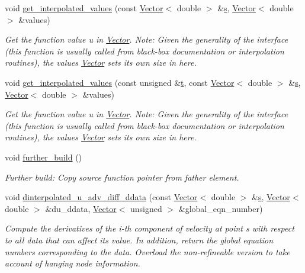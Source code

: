 \begin{DoxyCompactItemize}
void \hyperlink{classoomph_1_1RefineableAdvectionDiffusionEquations_af9dd36503e3196a7f640dbcebb22551d}{get\+\_\+interpolated\+\_\+values} (const \hyperlink{classoomph_1_1Vector}{Vector}$<$ double $>$ \&\hyperlink{cfortran_8h_ab7123126e4885ef647dd9c6e3807a21c}{s}, \hyperlink{classoomph_1_1Vector}{Vector}$<$ double $>$ \&values)
\begin{DoxyCompactList}\small\item\em Get the function value u in \hyperlink{classoomph_1_1Vector}{Vector}. Note\+: Given the generality of the interface (this function is usually called from black-\/box documentation or interpolation routines), the values \hyperlink{classoomph_1_1Vector}{Vector} sets its own size in here. \end{DoxyCompactList}\item 
void \hyperlink{classoomph_1_1RefineableAdvectionDiffusionEquations_a0a916bc1f20ff94e7feed984d41148fb}{get\+\_\+interpolated\+\_\+values} (const unsigned \&\hyperlink{cfortran_8h_af6f0bd3dc13317f895c91323c25c2b8f}{t}, const \hyperlink{classoomph_1_1Vector}{Vector}$<$ double $>$ \&\hyperlink{cfortran_8h_ab7123126e4885ef647dd9c6e3807a21c}{s}, \hyperlink{classoomph_1_1Vector}{Vector}$<$ double $>$ \&values)
\begin{DoxyCompactList}\small\item\em Get the function value u in \hyperlink{classoomph_1_1Vector}{Vector}. Note\+: Given the generality of the interface (this function is usually called from black-\/box documentation or interpolation routines), the values \hyperlink{classoomph_1_1Vector}{Vector} sets its own size in here. \end{DoxyCompactList}\item 
void \hyperlink{classoomph_1_1RefineableAdvectionDiffusionEquations_a093f39b8be3671828b7018b1f6103c68}{further\+\_\+build} ()
\begin{DoxyCompactList}\small\item\em Further build\+: Copy source function pointer from father element. \end{DoxyCompactList}\item 
void \hyperlink{classoomph_1_1RefineableAdvectionDiffusionEquations_abebbab739a9f15f659ad6039499c7e59}{dinterpolated\+\_\+u\+\_\+adv\+\_\+diff\+\_\+ddata} (const \hyperlink{classoomph_1_1Vector}{Vector}$<$ double $>$ \&\hyperlink{cfortran_8h_ab7123126e4885ef647dd9c6e3807a21c}{s}, \hyperlink{classoomph_1_1Vector}{Vector}$<$ double $>$ \&du\+\_\+ddata, \hyperlink{classoomph_1_1Vector}{Vector}$<$ unsigned $>$ \&global\+\_\+eqn\+\_\+number)
\begin{DoxyCompactList}\small\item\em Compute the derivatives of the i-\/th component of velocity at point s with respect to all data that can affect its value. In addition, return the global equation numbers corresponding to the data. Overload the non-\/refineable version to take account of hanging node information. \end{DoxyCompactList}\end{DoxyCompactItemize}
